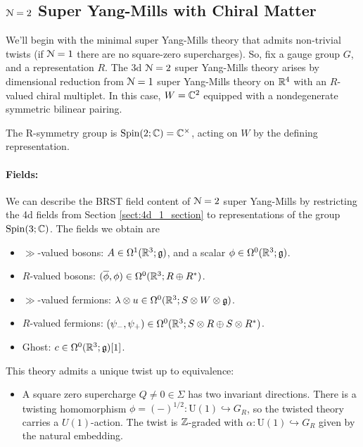 \documentclass[10pt, oneside]{article}
\renewcommand{\U}{\mathrm{U}}
\begin{document}
\subsection{\texorpdfstring{$\mathcal N = 2$}{N=2} Super Yang-Mills with Chiral Matter} 
\label{sect:3d_2_section}
We'll begin with the minimal super Yang-Mills theory that admits non-trivial twists (if $\mathcal{N}=1$ there are no square-zero supercharges).  So, fix a gauge group $G$, and a representation $R$.  The 3d $\mathcal{N}=2$ super Yang-Mills theory arises by dimensional reduction from $\mathcal{N}=1$ super Yang-Mills theory on $\mathbb R^4$ with an $R$-valued chiral multiplet.  In this case, $W = \mathbb C^2$ equipped with a nondegenerate symmetric bilinear pairing.

The R-symmetry group is $\mathrm{Spin}(2;\mathbb C) = \mathbb C^\times$, acting on $W$ by the defining representation.  

\vspace{-10pt}
\paragraph{Fields:} We can describe the BRST field content of $\mathcal{N}=2$ super Yang-Mills by restricting the 4d fields from Section \ref{sect:4d_1_section} to representations of the group $\mathrm{Spin}(3;\mathbb C)$.  The fields we obtain are
\begin{itemize}
 \item $\gg$-valued bosons: $A \in \Omega^1(\mathbb R^3; \mathfrak{g})$, and a scalar $\phi \in \Omega^0(\mathbb R^3; \mathfrak{g})$.
 \item $R$-valued bosons: $(\overline{\phi}, \phi) \in \Omega^0(\mathbb R^3 ; R \oplus R^*)$.
 \item $\gg$-valued fermions: $\lambda \otimes u \in \Omega^0(\mathbb R^3 ;  S \otimes W \otimes \mathfrak g)$.
 \item $R$-valued fermions: $(\psi_-,\psi_+) \in \Omega^0(\mathbb R^3 ; S \otimes R \oplus S \otimes R^*)$.
 \item Ghost: $c \in \Omega^0(\mathbb R^3; \mathfrak{g})[1]$.
\end{itemize}

This theory admits a unique twist up to equivalence:
\begin{itemize}
 \item A square zero supercharge $Q \ne 0 \in \Sigma$ has two invariant directions.  There is a twisting homomorphism $\phi = (-)^{1/2} \colon \U(1)\hookrightarrow G_R$, so the twisted theory carries a $U(1)$-action.
The twist is $\mathbb Z$-graded with $\alpha : \U(1) \hookrightarrow G_R$ given by the natural embedding. 
\end{itemize}
\end{document}
